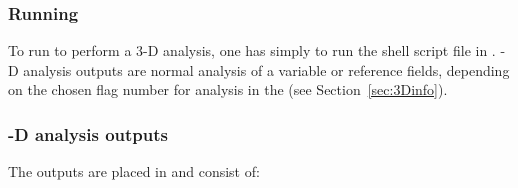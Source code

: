 \subsubsection{Running }

To run \diva to perform a 3-D analysis, one has simply to run the shell script file  in . -D analysis outputs are normal analysis of a variable or reference fields, depending on the chosen flag number for analysis in the  (see Section~\ref{sec:3Dinfo}).


\subsubsection{-D analysis outputs}

The outputs are placed in  and consist of:

